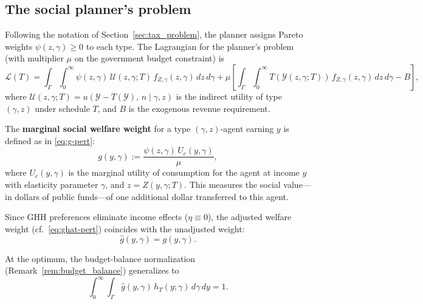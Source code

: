 \documentclass[12pt,a4paper]{article}
\theoremstyle{definition}
\theoremstyle{plain}
\theoremstyle{remark}
\newcommand{\calU}{\mathcal{U}}
\newcommand{\calL}{\mathcal{L}}
\newcommand{\calY}{\mathcal{Y}}
\begin{document}
\subsection{The social planner's problem}
\label{sec:2D_planner}

Following the notation of Section~\ref{sec:tax_problem}, the planner assigns Pareto weights $\psi(z,\gamma) \geq 0$ to each type.  The Lagrangian for the planner's problem (with multiplier $\mu$ on the government budget constraint) is
\begin{equation}
\label{eq:Lagrangian_2D}
  \calL(T) = \int_{\Gamma}\int_0^{\infty} \psi(z,\gamma)\,\calU(z,\gamma;T)\,f_{Z,\gamma}(z,\gamma)\,dz\,d\gamma
  + \mu\left[\int_{\Gamma}\int_0^{\infty} T(\calY(z,\gamma;T))\,f_{Z,\gamma}(z,\gamma)\,dz\,d\gamma - B\right],
\end{equation}
where $\calU(z,\gamma;T) = u(\calY - T(\calY),\,n \mid \gamma,z)$ is the indirect utility of type $(\gamma,z)$ under schedule $T$, and $B$ is the exogenous revenue requirement.

The \textbf{marginal social welfare weight} for a type $(\gamma,z)$-agent earning $y$ is defined as in \eqref{eq:g-pert}:
\begin{equation}
\label{eq:g_2D}
  g(y,\gamma) := \frac{\psi(z,\gamma)\,U_c(y,\gamma)}{\mu},
\end{equation}
where $U_c(y,\gamma)$ is the marginal utility of consumption for the agent at income $y$ with elasticity parameter $\gamma$, and $z = Z(y,\gamma;T)$.  This measures the social value---in dollars of public funds---of one additional dollar transferred to this agent.

Since GHH preferences eliminate income effects ($\eta \equiv 0$), the adjusted welfare weight (cf.\ \eqref{eq:ghat-pert}) coincides with the unadjusted weight:
\begin{equation}
\label{eq:ghat_2D}
  \hat{g}(y,\gamma) = g(y,\gamma).
\end{equation}

At the optimum, the budget-balance normalization (Remark~\ref{rem:budget_balance}) generalizes to
\begin{equation}
\label{eq:g_normalize_2D}
  \int_0^{\infty}\int_{\Gamma} \hat{g}(y,\gamma)\,h_T(y;\gamma)\,d\gamma\,dy = 1.
\end{equation}

\end{document}
